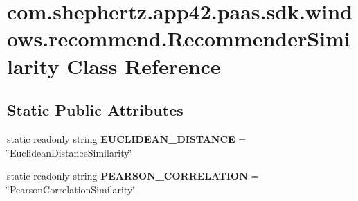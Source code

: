 \hypertarget{classcom_1_1shephertz_1_1app42_1_1paas_1_1sdk_1_1windows_1_1recommend_1_1_recommender_similarity}{\section{com.\+shephertz.\+app42.\+paas.\+sdk.\+windows.\+recommend.\+Recommender\+Similarity Class Reference}
\label{classcom_1_1shephertz_1_1app42_1_1paas_1_1sdk_1_1windows_1_1recommend_1_1_recommender_similarity}
}
\subsection*{Static Public Attributes}
\begin{DoxyCompactItemize}
\item 
\hypertarget{classcom_1_1shephertz_1_1app42_1_1paas_1_1sdk_1_1windows_1_1recommend_1_1_recommender_similarity_a79ce8d328ee540d8379ebe770a9c53ec}{static readonly string {\bfseries E\+U\+C\+L\+I\+D\+E\+A\+N\+\_\+\+D\+I\+S\+T\+A\+N\+C\+E} = \char`\"{}Euclidean\+Distance\+Similarity\char`\"{}}\label{classcom_1_1shephertz_1_1app42_1_1paas_1_1sdk_1_1windows_1_1recommend_1_1_recommender_similarity_a79ce8d328ee540d8379ebe770a9c53ec}

\item 
\hypertarget{classcom_1_1shephertz_1_1app42_1_1paas_1_1sdk_1_1windows_1_1recommend_1_1_recommender_similarity_ab0ef065c2a48b95202e710934a920168}{static readonly string {\bfseries P\+E\+A\+R\+S\+O\+N\+\_\+\+C\+O\+R\+R\+E\+L\+A\+T\+I\+O\+N} = \char`\"{}Pearson\+Correlation\+Similarity\char`\"{}}\label{classcom_1_1shephertz_1_1app42_1_1paas_1_1sdk_1_1windows_1_1recommend_1_1_recommender_similarity_ab0ef065c2a48b95202e710934a920168}

\end{DoxyCompactItemize}
